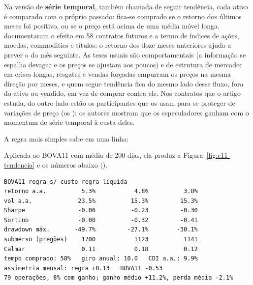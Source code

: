 Na versão de \textbf{série temporal}, também chamada de seguir tendência, cada ativo é comparado com o próprio passado: fica-se comprado se o retorno dos últimos meses foi positivo, ou se o preço está acima de uma média móvel longa. \citet{moskowitz2012} documentaram o efeito em 58 contratos futuros e a termo de índices de ações, moedas, commodities e títulos: o retorno dos doze meses anteriores ajuda a prever o do mês seguinte. As teses usuais são comportamentais (a informação se espalha devagar e os preços se ajustam aos poucos) e de estrutura de mercado: em crises longas, resgates e vendas forçadas empurram os preços na mesma direção por meses, e quem segue tendência fica do mesmo lado desse fluxo, fora do ativo ou vendido, em vez de comprar contra ele. Nos contratos que o artigo estuda, do outro lado estão os participantes que os usam para se proteger de variações de preço (os ): os autores mostram que os especuladores ganham com o momentum de série temporal à custa deles.

A regra mais simples cabe em uma linha:



Aplicada ao BOVA11 com média de 200 dias, ela produz a Figura~\ref{fig:c11-tendencia} e os números abaixo ().

\begin{lstlisting}[style=saida]
                    BOVA11 regra s/ custo regra líquida
retorno a.a.          5.3%           4.8%          3.8%
vol a.a.             23.5%          15.3%         15.3%
Sharpe               -0.06          -0.23         -0.30
Sortino              -0.08          -0.32         -0.41
drawdown máx.       -49.7%         -27.1%        -30.1%
submerso (pregões)    1700           1123          1141
Calmar                0.11           0.18          0.12
tempo comprado: 58%   giro anual: 10.0   CDI a.a.: 9.9%
assimetria mensal: regra +0.13   BOVA11 -0.53
79 operações, 8% com ganho; ganho médio +11.2%, perda média -2.1%
\end{lstlisting}


